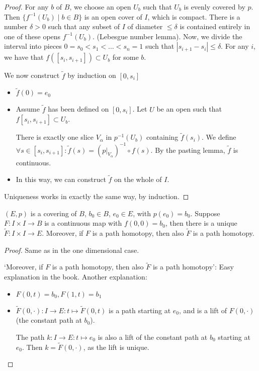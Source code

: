 \begin{proof}
    For any $b$ of $B$, we choose an open $U_b$ such that $U_b$ is evenly covered by $p$.
    Then $\{ f^{-1}(U_b)  \mid  b \in B\}$ is an open cover of $I$, which is compact.
    There is a number $\delta > 0$ such that any subset of $I$ of diameter $\le  \delta$ is contained entirely in one of these opens $f^{-1}(U_b)$. (Lebesgue number lemma).
    Now, we divide the interval into pieces $0 = s_0 < s_1 < \ldots < s_n = 1$ such that $|s_{i+1} - s_i| \le \delta$.
    For any $i$, we have that $f([s_i, s_{i+1}]) \subset U_b$ for some $b$.


    We now construct $\tilde f$ by induction on $[0, s_i]$
    \begin{itemize}
        \item $\tilde f (0) = e_0$ 
        \item Assume $\tilde f$ has been defined on  $[0, s_i]$.
            Let  $U$ be an open such that $f[s_i, s_{i+1}] \subset U_b$.

            There is exactly one slice $V_\alpha$ in $p^{-1}(U_b)$ containing $\tilde f(s_i)$.
            We define  $\forall  s \in [s_i, s_{i+1}]: \tilde f(s) = (p|_{V_\alpha})^{-1} \circ f(s)$.
            By the pasting lemma, $\tilde f$ is continuous.
        \item In this way, we can construct $\tilde f$ on the whole of  $I$.
    \end{itemize}

    Uniqueness works in exactly the same way, by induction.
\end{proof}


\begin{lemma}[54.2]
    $(E, p)$ is a covering of  $B$, $b_0 \in B$, $e_0 \in E$, with $p(e_0) = b_0$.
    Suppose $F: I \times I \to  B$ is a continuous map with $f(0, 0) = b_0$, then there is a unique $\tilde F: I \times I \to E.$
    Moreover, if $F$ is a path homotopy, then also $\tilde F$ is a path homotopy.
\end{lemma}
\begin{proof}
    Same as in the one dimensional case.


    `Moreover, if $F$ is a path homotopy, then also $\tilde F$ is a path homotopy': Easy explanation in the book. Another explanation:


\begin{itemize}
    \item $F(0, t) = b_0, F(1, t) = b_1$
    \item $\tilde F (0, \cdot ) : I \to  E: t \mapsto  \tilde F(0, t)$ is a path starting at $e_0$,
        and is a lift of $F(0, \cdot )$ (the constant path at $b_0$).

        The path $k: I \to  E: t \mapsto  e_0$ is also a lift of the constant path at $b_0$ starting at $e_0$.
        Then $k = \tilde F(0, \cdot )$, as the lift is unique.
\end{itemize}
\end{proof}


